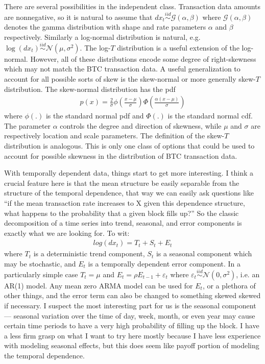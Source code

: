 \documentclass{article}
\begin{document}
There are several possibilities in the independent class. Transaction data amounts are nonnegative, so it is natural to assume that $dx_t \stackrel{iid}{\sim}\mathcal{G}(\alpha,\beta)$ where $\mathcal{G}(\alpha,\beta)$ denotes the gamma distribution with shape and rate parameters $\alpha$ and $\beta$ respectively. Similarly a log-normal distribution is natural, e.g. $\log(dx_t) \stackrel{iid}{\sim}\mathcal{N}(\mu,\sigma^2)$. The log-$T$ distribution is a useful extension of the log-normal. However, all of these distributions encode some degree of right-skewness which may not match the BTC transaction data. A useful generalization to account for all possible sorts of skew is the skew-normal or more generally skew-$T$ distribution. The skew-normal distribution has the pdf
\begin{align*}
p(x) = \frac{2}{\sigma}\phi\left(\frac{x-\mu}{\sigma}\right)\Phi\left(\frac{\alpha(x-\mu)}{\sigma}\right)
\end{align*}
where $\phi(.)$ is the standard normal pdf and $\Phi(.)$ is the standard normal cdf. The parameter $\alpha$ controls the degree and direction of skewness, while $\mu$ and $\sigma$ are respectively location and scale parameters. The definition of the skew-$T$ distribution is analogous. This is only one class of options that could be used to account for possible skewness in the distribution of BTC transaction data.

With temporally dependent data, things start to get more interesting. I think a crucial feature here is that the mean structure be easily separable from the structure of the temporal dependence, that way we can easily ask questions like ``if the mean transaction rate increases to X given this dependence structure, what happens to the probability that a given block fills up?'' So the classic decomposition of a time series into trend, seasonal, and error components is exactly what we are looking for. To wit:
\begin{align*}
log(dx_t) = T_t + S_t + E_t
\end{align*}
where $T_t$ is a deterministic trend component, $S_t$ is a seasonal component which may be stochastic, and $E_t$ is a temporally dependent error component. In a particularly simple case $T_t = \mu$ and $E_t = \rho E_{t-1} + \varepsilon_t$ where $\varepsilon_t \stackrel{iid}{\sim} \mathcal{N}(0,\sigma^2)$, i.e. an AR(1) model. Any mean zero ARMA model can be used for $E_t$, or a plethora of other things, and the error term can also be changed to something skewed skewed if necessary. I suspect the most interesting part for us is the seasonal component --- seasonal variation over the time of day, week, month, or even year may cause certain time periods to have a very high probability of filling up the block. I have a less firm grasp on what I want to try here mostly because I have less experience with modeling seasonal effects, but this does seem like payoff portion of modeling the temporal dependence. 
\end{document}
